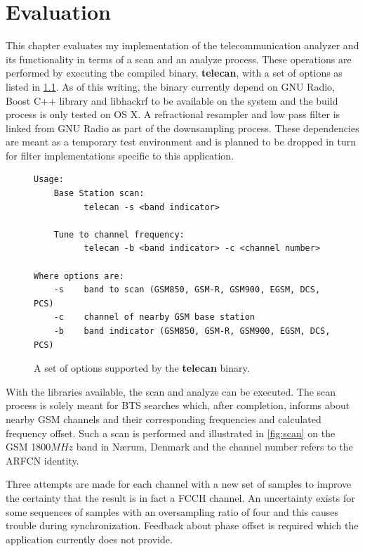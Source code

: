\chapter{Evaluation}
This chapter evaluates my implementation of the telecommunication
analyzer and its functionality in terms of a scan and an analyze
process. These operations are performed by executing the compiled
binary, \textbf{telecan}, with a set of options as listed in
\cref{fig:usage}. As of this writing, the binary currently depend on
GNU Radio, Boost C++ library and libhackrf to be available on the
system and the build process is only tested on OS X. A refractional
resampler and low pass filter is linked from GNU Radio as part of the
downsampling process. These dependencies are meant as a temporary test
environment and is planned to be dropped in turn for filter
implementations specific to this application.

\begin{figure}[H]
  \centering
  \begin{BVerbatim}
Usage:
    Base Station scan:
          telecan -s <band indicator>

    Tune to channel frequency:
          telecan -b <band indicator> -c <channel number>

Where options are:
    -s    band to scan (GSM850, GSM-R, GSM900, EGSM, DCS, PCS)
    -c    channel of nearby GSM base station
    -b    band indicator (GSM850, GSM-R, GSM900, EGSM, DCS, PCS)
\end{BVerbatim}
  \caption{A set of options supported by the \textbf{telecan} binary.}
  \label{fig:usage}
\end{figure}

With the libraries available, the scan and analyze can be
executed. The scan process is solely meant for \gls{BTS} searches
which, after completion, informs about nearby \gls{GSM} channels and
their corresponding frequencies and calculated frequency offset. Such
a scan is performed and illustrated in \cref{fig:scan} on the
\gls{GSM} 1800$\si{MHz}$ band in Nærum, Denmark and the channel number
refers to the \gls{ARFCN} identity.

Three attempts are made for each channel with a new set of samples to
improve the certainty that the result is in fact a \gls{FCCH}
channel. An uncertainty exists for some sequences of samples with an
oversampling ratio of four and this causes trouble during
synchronization. Feedback about phase offset is required which the
application currently does not provide.

